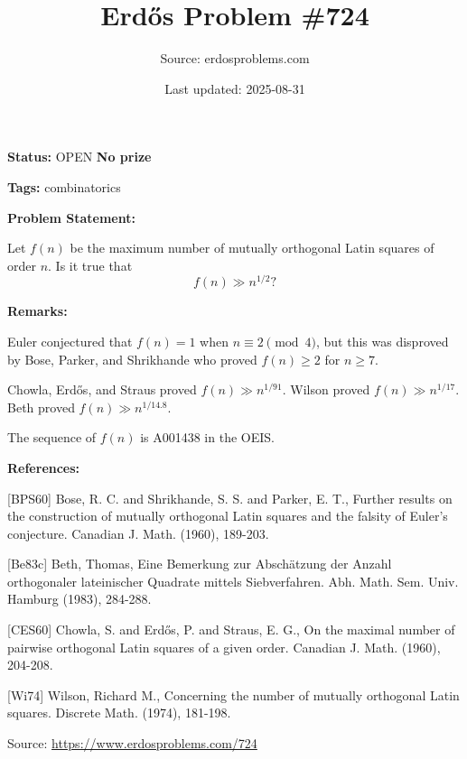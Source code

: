 \documentclass{article}
\title{Erd\H{o}s Problem \#724}
\date{Last updated: 2025-08-31}
\author{Source: erdosproblems.com}
\begin{document}
\maketitle

\noindent\textbf{Status:} OPEN \quad \textbf{No prize}

\noindent\textbf{Tags:} combinatorics

\medskip
\noindent\textbf{Problem Statement:}

Let $f(n)$ be the maximum number of mutually orthogonal Latin squares of order $n$. Is it true that\[f(n) \gg n^{1/2}?\]

\bigskip
\noindent\textbf{Remarks:}

Euler conjectured that $f(n)=1$ when $n\equiv 2\pmod{4}$, but this was disproved by Bose, Parker, and Shrikhande \cite{BPS60} who proved $f(n)\geq 2$ for $n\geq 7$.

Chowla, Erd\H{o}s, and Straus \cite{CES60} proved $f(n) \gg n^{1/91}$. Wilson \cite{Wi74} proved $f(n) \gg n^{1/17}$. Beth \cite{Be83c} proved $f(n) \gg n^{1/14.8}$. 

The sequence of $f(n)$ is A001438 in the OEIS.

\bigskip
\noindent\textbf{References:}

[BPS60] Bose, R. C. and Shrikhande, S. S. and Parker, E. T., Further results on the construction of mutually orthogonal
Latin squares and the falsity of Euler's conjecture. Canadian J. Math. (1960), 189-203.
 
 [Be83c] Beth, Thomas, Eine Bemerkung zur Absch\"{a}tzung der Anzahl orthogonaler
lateinischer Quadrate mittels Siebverfahren. Abh. Math. Sem. Univ. Hamburg (1983), 284-288.
 
 [CES60] Chowla, S. and Erd\H{o}s, P. and Straus, E. G., On the maximal number of pairwise orthogonal Latin squares
of a given order. Canadian J. Math. (1960), 204-208.
 
 [Wi74] Wilson, Richard M., Concerning the number of mutually orthogonal Latin squares. Discrete Math. (1974), 181-198.

\bigskip
\noindent\small{Source: \url{https://www.erdosproblems.com/724}}
\end{document}
